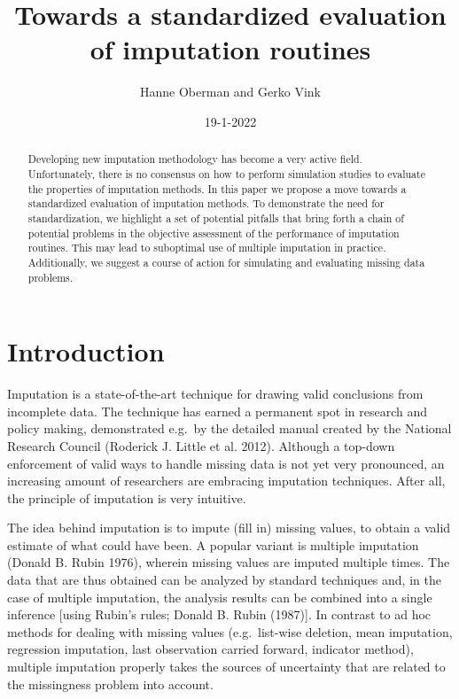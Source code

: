 \documentclass[
]{article}
\title{Towards a standardized evaluation of imputation routines}
\author{Hanne Oberman and Gerko Vink}
\date{19-1-2022}
\begin{document}
\maketitle
\begin{abstract}
Developing new imputation methodology has become a very active field.
Unfortunately, there is no consensus on how to perform simulation
studies to evaluate the properties of imputation methods. In this paper
we propose a move towards a standardized evaluation of imputation
methods. To demonstrate the need for standardization, we highlight a set
of potential pitfalls that bring forth a chain of potential problems in
the objective assessment of the performance of imputation routines. This
may lead to suboptimal use of multiple imputation in practice.
Additionally, we suggest a course of action for simulating and
evaluating missing data problems.
\end{abstract}

\hypertarget{introduction}{%
\section{Introduction}\label{introduction}}

Imputation is a state-of-the-art technique for drawing valid conclusions
from incomplete data. The technique has earned a permanent spot in
research and policy making, demonstrated e.g.~by the detailed manual
created by the National Research Council (Roderick J. Little et al.
2012). Although a top-down enforcement of valid ways to handle missing
data is not yet very pronounced, an increasing amount of researchers are
embracing imputation techniques. After all, the principle of imputation
is very intuitive.

The idea behind imputation is to impute (fill in) missing values, to
obtain a valid estimate of what could have been. A popular variant is
multiple imputation (Donald B. Rubin 1976), wherein missing values are
imputed multiple times. The data that are thus obtained can be analyzed
by standard techniques and, in the case of multiple imputation, the
analysis results can be combined into a single inference {[}using
Rubin's rules; Donald B. Rubin (1987){]}. In contrast to ad hoc methods
for dealing with missing values (e.g.~list-wise deletion, mean
imputation, regression imputation, last observation carried forward,
indicator method), multiple imputation properly takes the sources of
uncertainty that are related to the missingness problem into account.
\end{document}
